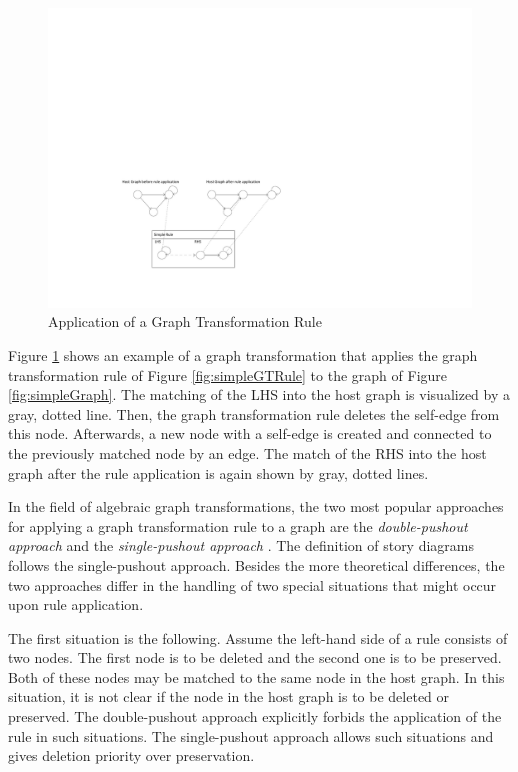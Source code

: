\begin{figure}[htbp]
  \centering
  \includegraphics[width=\linewidth]{figures/GTApplication}
  \caption{Application of a Graph Transformation Rule}
  \label{fig:GTApplication}
\end{figure}

Figure \ref{fig:GTApplication} shows an example of a graph transformation that applies the graph transformation rule of Figure \ref{fig:simpleGTRule} to the graph of Figure \ref{fig:simpleGraph}. The matching of the LHS into the host graph is visualized by a gray, dotted line. Then, the graph transformation rule deletes the self-edge from this node. Afterwards, a new node with a self-edge is created and connected to the previously matched node by an edge. The match of the RHS into the host graph after the rule application is again shown by gray, dotted lines.

In the field of algebraic graph transformations, the two most popular approaches for applying a graph transformation rule to a graph are the
\emph{double-pushout approach} \cite{Roz97} and the \emph{single-pushout
approach} \cite{Roz97}. The definition of story diagrams follows the
single-pushout approach. Besides the more theoretical differences, the two
approaches differ in the handling of two special situations that might occur
upon rule application.

The first situation is the following. Assume the left-hand side of a rule
consists of two nodes. The first node is to be deleted and the second one is
to be preserved. Both of these nodes may be matched to the same node in the host
graph. In this situation, it is not clear if the node in the host graph is to be
deleted or preserved. The double-pushout approach explicitly forbids the application of the rule in such
situations. The single-pushout approach allows such situations and gives
deletion priority over preservation.

